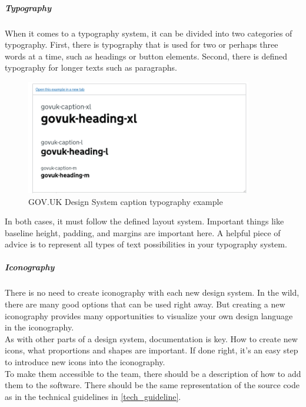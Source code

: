 \subparagraph{Typography}
When it comes to a typography system, it can be divided into two categories of typography. First, there is typography that is used for two or perhaps three words at a time, such as headings or button elements. Second, there is defined typography for longer texts such as paragraphs. \\
\begin{figure}[hbtp]
	\centerline{\includegraphics[height=5cm]{images/gov_uk_typo.png}}
	\caption{GOV.UK Design System caption typography example \cite{govuk_govuk_nodate}}
	\label{gov_uk_typo}
\end{figure}
In both cases, it must follow the defined layout system. Important things like baseline height, padding, and margins are important here. A helpful piece of advice is to represent all types of text possibilities in your typography system.  \cite{vesselov_building_2019}


\subparagraph{Iconography}
There is no need to create iconography with each new design system. In the wild, there are many good options that can be used right away. But creating a new iconography provides many opportunities to visualize your own design language in the iconography.
\\
As with other parts of a design system, documentation is key. How to create new icons, what proportions and shapes are important. If done right, it's an easy step to introduce new icons into the iconography. 
\\
To make them accessible to the team, there should be a description of how to add them to the software. There should be the same representation of the source code as in the technical guidelines in \ref{tech_guideline}. \cite{vesselov_building_2019}

